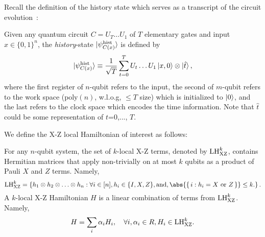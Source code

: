 Recall the definition of the history state which serves as a transcript of the circuit evolution~\cite{kitaev2002classical}:

\begin{dfn}
	\label{dfn:groundstate}	
    Given any quantum circuit $C=U_T\ldots U_1$ of $T$ elementary gates and input $x\in\{0,1\}^n$, the \emph{history}-state $\ket{\psi_{C(x)}^{\mathrm{hist}}}$ is defined by
    \begin{equation}
        \ket{\psi_{C(x)}^{\mathrm{hist}}} \equiv \frac{1}{\sqrt{T}}\sum_{t=0}^TU_t\ldots U_1\ket{x,0}\otimes\ket{\hat{t}},
    \end{equation}
    where the first register of $n$-qubit refers to the input, the second of $m$-qubit refers to the work space ($\mathrm{poly}(n)$, w.l.o.g, $\leq T$ size) which is initialized to $\ket{0}$, and the last refers to the clock space which encodes the time information. Note that $\hat{t}$ could be some representation of $t$=0,..., $T$. 
\end{dfn}



We define the X-Z local Hamiltonian of interest as follows: 

\begin{dfn} For any $n$-qubit system, the set of $k$-local X-Z terms, denoted by $\mathrm{LH}_{\mathrm{XZ}}^{k}$, contains Hermitian matrices that apply non-trivially on at most $k$ qubits as a product of Pauli $X$ and $Z$ terms. Namely, 
\begin{equation}
  \LHXZ{k} = \left\{h_1 \otimes h_2 \otimes \ldots \otimes h_n: \forall i \in [n], h_i \in \{I, X, Z\}, \text{and}, \abs{\set{i: h_i=X \text{ or }Z}} \leq k. \right \}. 
\end{equation}
A $k$-local X-Z Hamiltonian $H$ is a linear combination of terms from $\mathrm{LH}_{\mathrm{XZ}}^{k}$. Namely, 
\begin{equation}
  H = \sum_i \alpha_{i} H_i,  \quad \forall i, \alpha_i \in R,  H_i \in \mathrm{LH}_{\mathrm{XZ}}^{k}.
\end{equation}
\end{dfn}

